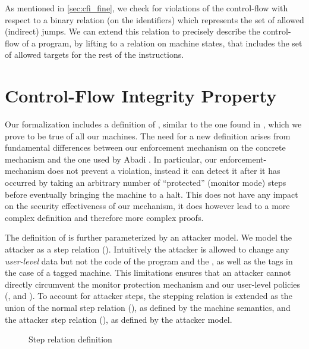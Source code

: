 
As mentioned in \ref{sec:cfi_fine}, we check for violations of the control-flow
with respect to a binary relation (on the identifiers) \CFG which represents
the set of allowed (indirect) jumps. We can extend this relation to precisely
describe the control-flow of a program, by lifting \CFG to a relation 
\SUCC on machine states, that includes the set of allowed targets for the rest
of the instructions. 


\section{Control-Flow Integrity Property}\label{sec:cfi_property}

Our formalization includes a definition of \CFI, similar to the one found in
\cite{abadi2005}, which we prove to be true of all our machines. The need for a
new definition arises from fundamental differences between our enforcement
mechanism on the concrete mechanism and the one used by Abadi \ETAL. In
particular, our enforcement-mechanism does not prevent a violation, instead
it can detect it after it has occurred by taking an arbitrary number of
``protected'' (monitor mode) steps before eventually bringing the machine to a
halt. This does not have any impact on the security effectiveness of our
mechanism, it does however lead to a more complex definition and therefore
more complex proofs.

The definition of \CFI is further parameterized by an attacker model. We
model the attacker as a step relation (\stepa{}{}). Intuitively the attacker is
allowed to change any \emph{user-level} data but not the code of the program and
the \pc, as well as the tags in the case of a tagged machine. 
This limitations ensures that an attacker cannot directly circumvent the monitor
protection mechanism and our user-level policies (\NWC , \NXD and \CFI). To 
account for attacker steps, the stepping relation is extended as the union of 
the normal step relation (\stepn{}{}), as defined by the machine semantics, and
the attacker step relation (\stepa{}{}), as defined by the attacker model.

\begin{figure}[ht]
\centering
\begin{minipage}[b]{0.25\linewidth}
\centering
{}
\label{fig:step_stepn}
\end{minipage}
\hspace{0.5cm}
\begin{minipage}[b]{0.15\linewidth}
\centering
{}
\label{fig:step_stepa}
\end{minipage}
\caption{Step relation definition}
\end{figure}

